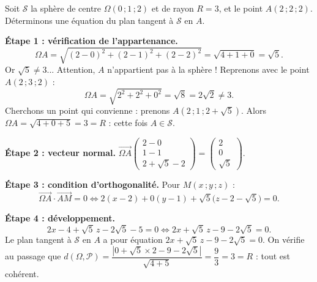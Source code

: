 \documentclass[11pt]{article}
\begin{document}
\begin{exemplebox}
Soit $\mathcal{S}$ la sphère de centre $\Omega(0\,;1\,;2)$ et de rayon $R=3$, et le point $A(2\,;2\,;2)$. Déterminons une équation du plan tangent à $\mathcal{S}$ en $A$.

\textbf{Étape 1 : vérification de l'appartenance.}
\[
\Omega A=\sqrt{(2-0)^{2}+(2-1)^{2}+(2-2)^{2}}=\sqrt{4+1+0}=\sqrt{5}.
\]
Or $\sqrt{5}\neq 3$... Attention, $A$ n'appartient pas à la sphère ! Reprenons avec le point $A(2\,;3\,;2)$ :
\[
\Omega A=\sqrt{2^{2}+2^{2}+0^{2}}=\sqrt{8}=2\sqrt{2}\neq 3.
\]
Cherchons un point qui convienne : prenons $A(2\,;1\,;2+\sqrt{5})$. Alors $\Omega A=\sqrt{4+0+5}=3=R$ : cette fois $A\in\mathcal{S}$.

\textbf{Étape 2 : vecteur normal.} $\overrightarrow{\Omega A}\begin{pmatrix} 2-0 \\ 1-1 \\ 2+\sqrt{5}-2 \end{pmatrix}=\begin{pmatrix} 2 \\ 0 \\ \sqrt{5} \end{pmatrix}$.

\textbf{Étape 3 : condition d'orthogonalité.} Pour $M(x\,;y\,;z)$ :
\[
\overrightarrow{\Omega A}\cdot\overrightarrow{AM}=0
\iff 2(x-2)+0(y-1)+\sqrt{5}\bigl(z-2-\sqrt{5}\bigr)=0.
\]

\textbf{Étape 4 : développement.}
\[
2x-4+\sqrt{5}\,z-2\sqrt{5}-5=0
\iff 2x+\sqrt{5}\,z-9-2\sqrt{5}=0.
\]
Le plan tangent à $\mathcal{S}$ en $A$ a pour équation $2x+\sqrt{5}\,z-9-2\sqrt{5}=0$. On vérifie au passage que $d(\Omega,\mathcal{P})=\dfrac{|0+\sqrt{5}\times 2-9-2\sqrt{5}|}{\sqrt{4+5}}=\dfrac{9}{3}=3=R$ : tout est cohérent.
\end{exemplebox}
\end{document}
